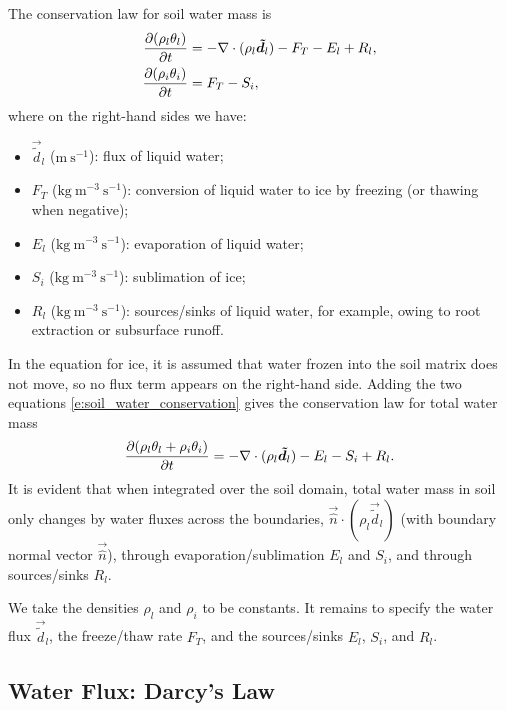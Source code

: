 \documentclass{report}
\begin{document}
The conservation law for soil water mass is
\begin{subequations}\label{e:soil_water_conservation}
\begin{align}
\frac{\partial (\rho_l \theta_l)}{\partial t} &= - \nabla \cdot (\rho_l \boldsymbol{{\tilde d}}_l) - F_T - E_l + R_l, \\
\frac{\partial (\rho_i \theta_i)}{\partial t} &= F_T - S_i,
\end{align}
\end{subequations}
where on the right-hand sides we have:
\begin{itemize}
    \item $\vec{\tilde d}_l$ ($\mathrm{m~s^{-1}}$): flux of liquid water;
    \item $F_T$ ($\mathrm{kg~m^{-3}~s^{-1}}$): conversion of liquid water to ice by freezing (or thawing when negative); 
    \item $E_l$ ($\mathrm{kg~m^{-3}~s^{-1}}$): evaporation of liquid water;
    \item $S_i$ ($\mathrm{kg~m^{-3}~s^{-1}}$): sublimation of ice;
    \item $R_l$ ($\mathrm{kg~m^{-3}~s^{-1}}$): sources/sinks of liquid water, for example, owing to root extraction or subsurface runoff.
\end{itemize}
In the equation for ice, it is assumed that water frozen into the soil matrix does not move, so no flux term appears on the right-hand side. Adding the two equations \eqref{e:soil_water_conservation} gives the conservation law for total water mass
\[
\frac{\partial (\rho_l \theta_l + \rho_i \theta_i)}{\partial t} = - \nabla \cdot (\rho_l \boldsymbol{{\tilde d}}_l) - E_l - S_i + R_l.
\]
It is evident that when integrated over the soil domain, total water mass in soil only changes by water fluxes across the boundaries, $\vec{\hat n} \cdot (\rho_l \vec{\tilde d}_l)$ (with boundary normal vector $\vec{\hat n}$), through evaporation/sublimation $E_l$ and $S_i$, and through sources/sinks $R_l$.

We take the densities $\rho_l$ and $\rho_i$ to be constants. It remains to specify the water flux $\vec{\tilde d}_l$, the freeze/thaw rate $F_T$, and the sources/sinks $E_l$, $S_i$, and $R_l$.

\subsection{Water Flux: Darcy's Law}
\end{document}
